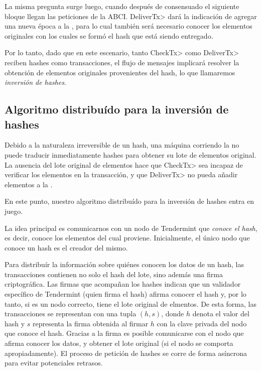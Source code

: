 %

La misma pregunta surge luego,
cuando después de consensuado el siguiente bloque llegan las peticiones de la ABCI.
%
\<DeliverTx> dará la indicación de agregar una nueva época a la \setchain, para lo cual también
será necesario conocer los elementos originales con los cuales se formó el hash que está siendo entregado.

Por lo tanto, dado que en este escenario, tanto \<CheckTx> como \<DeliverTx> reciben hashes como transacciones,
el flujo de mensajes implicará resolver la obtención de elementos originales provenientes del hash, lo que llamaremos
\textit{inversión de hashes}.


\subsection{Algoritmo distribuído para la inversión de hashes}

%
%
Debido a la naturaleza irreversible de un hash, una máquina corriendo la \setchain no puede traducir
inmediatamente hashes para obtener su lote de elementos original.
%
La ausencia del lote original de elementos hace que \<CheckTx> sea incapaz de verificar los elementos
en la transacción, y que \<DeliverTx> no pueda añadir elementos a la \setchain.
%

En este punto, nuestro algoritmo distribuído para la inversión de hashes entra en juego.
%

La idea principal es comunicarnos con un nodo de Tendermint que \textit{conoce el hash}, es decir,
conoce los elementos del cual proviene.
%
Inicialmente, el único nodo que conoce un hash es el creador del mismo.
%

Para distribuír la información sobre quiénes conocen los datos de un hash, las transacciones contienen
no solo el hash del lote, sino además una firma criptográfica.
%
Las firmas que acompañan los hashes indican que un validador específico de Tendermint
(quien firma el hash) afirma conocer el hash y, por lo tanto, si es un nodo correcto,
tiene el lote original de elmentos.
%
De esta forma, las transacciones se representan con una tupla $(h, s)$, donde $h$ denota
el valor del hash y $s$ representa la firma obtenida al firmar $h$ con la clave privada
del nodo que conoce el hash.
%
Gracias a la firma es posible comunicarse con el nodo que afirma conocer los datos, y obtener
el lote original (si el nodo se comporta apropiadamente).
%
El proceso de petición de hashes se corre de forma asíncrona para evitar potenciales
retrasos.

